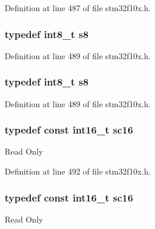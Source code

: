 Definition at line 487 of file stm32f10x.\+h.

\subsubsection[{\texorpdfstring{s8}{s8}}]{\setlength{\rightskip}{0pt plus 5cm}typedef {\bf int8\+\_\+t} {\bf s8}}\hypertarget{group___exported__types_ga9e382f207c65ca13ab4ae98363aeda80}{}\label{group___exported__types_ga9e382f207c65ca13ab4ae98363aeda80}


Definition at line 489 of file stm32f10x.\+h.

\subsubsection[{\texorpdfstring{s8}{s8}}]{\setlength{\rightskip}{0pt plus 5cm}typedef {\bf int8\+\_\+t} {\bf s8}}\hypertarget{group___exported__types_ga9e382f207c65ca13ab4ae98363aeda80}{}\label{group___exported__types_ga9e382f207c65ca13ab4ae98363aeda80}


Definition at line 489 of file stm32f10x.\+h.

\subsubsection[{\texorpdfstring{sc16}{sc16}}]{\setlength{\rightskip}{0pt plus 5cm}typedef const {\bf int16\+\_\+t} {\bf sc16}}\hypertarget{group___exported__types_ga66ab742a0751bb4e7661b8e874f2ddda}{}\label{group___exported__types_ga66ab742a0751bb4e7661b8e874f2ddda}
Read Only 

Definition at line 492 of file stm32f10x.\+h.

\subsubsection[{\texorpdfstring{sc16}{sc16}}]{\setlength{\rightskip}{0pt plus 5cm}typedef const {\bf int16\+\_\+t} {\bf sc16}}\hypertarget{group___exported__types_ga66ab742a0751bb4e7661b8e874f2ddda}{}\label{group___exported__types_ga66ab742a0751bb4e7661b8e874f2ddda}
Read Only 


